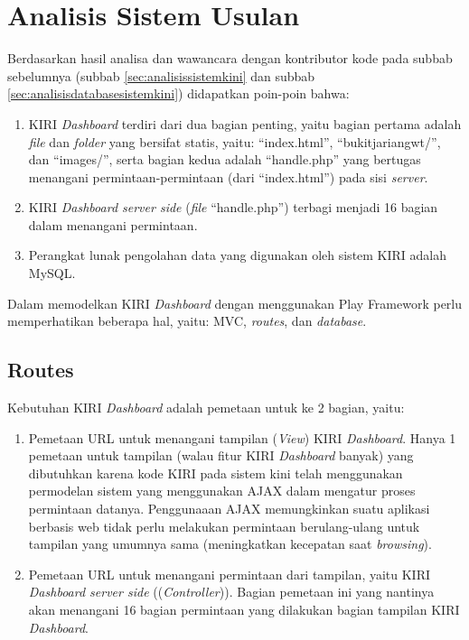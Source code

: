 \section{Analisis Sistem Usulan}
\label{sec:analisissistemusulan}
Berdasarkan hasil analisa dan wawancara dengan kontributor kode pada subbab sebelumnya (subbab \ref{sec:analisissistemkini} dan subbab \ref{sec:analisisdatabasesistemkini}) didapatkan poin-poin bahwa:
\begin{enumerate}
	\item KIRI \textit{Dashboard} terdiri dari dua bagian penting, yaitu bagian pertama adalah \textit{file} dan \textit{folder} yang bersifat statis, yaitu: ``index.html'', ``bukitjariangwt/'', dan ``images/'', serta bagian kedua adalah ``handle.php'' yang bertugas menangani permintaan-permintaan (dari ``index.html'') pada sisi \textit{server}.
	\item KIRI \textit{Dashboard server side} (\textit{file} ``handle.php'') terbagi menjadi 16 bagian dalam menangani permintaan.
	\item Perangkat lunak pengolahan data yang digunakan oleh sistem KIRI adalah MySQL.
\end{enumerate}

Dalam memodelkan KIRI \textit{Dashboard} dengan menggunakan Play Framework perlu memperhatikan beberapa hal, yaitu: MVC, \textit{routes}, dan \textit{database}.

\subsection{Routes}
\label{sec:routesusulan}
Kebutuhan KIRI \textit{Dashboard} adalah pemetaan untuk ke 2 bagian, yaitu:
\begin{enumerate}
	\item Pemetaan URL untuk menangani tampilan (\textit{View}) KIRI \textit{Dashboard}. Hanya 1 pemetaan untuk tampilan (walau fitur KIRI \textit{Dashboard} banyak) yang dibutuhkan karena kode KIRI pada sistem kini telah menggunakan permodelan sistem yang menggunakan AJAX dalam mengatur proses permintaan datanya. Penggunaaan AJAX memungkinkan suatu aplikasi berbasis web tidak perlu melakukan permintaan berulang-ulang untuk tampilan yang umumnya sama (meningkatkan kecepatan saat \textit{browsing}).
	\item Pemetaan URL untuk menangani permintaan dari tampilan, yaitu KIRI \textit{Dashboard server side} ((\textit{Controller})). Bagian pemetaan ini yang nantinya akan menangani 16 bagian permintaan yang dilakukan bagian tampilan KIRI \textit{Dashboard}.
\end{enumerate}

